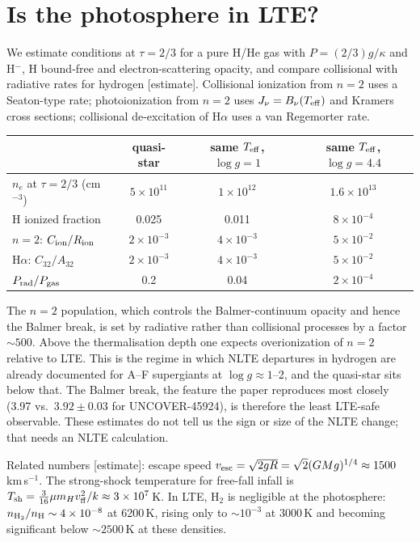 \documentclass[11pt]{article}
\newcommand{\status}[1]{\textsf{\small\textcolor{black!60}{[#1]}}}
\begin{document}
\section{Is the photosphere in LTE?}\label{sec:nlte}
We estimate conditions at $\tau=2/3$ for a pure H/He gas with $P=(2/3)g/\kappa$ and H$^-$, H bound-free
and electron-scattering opacity, and compare collisional with radiative rates for hydrogen
\status{estimate}. Collisional ionization from $n=2$ uses a Seaton-type rate; photoionization from $n=2$ uses
$J_\nu=B_\nu(T_{\rm eff})$ and Kramers cross sections; collisional de-excitation of H$\alpha$ uses a van
Regemorter rate.
\begin{center}
\begin{tabular}{lccc}
\toprule
 & quasi-star & same $T_{\rm eff}$, $\log g=1$ & same $T_{\rm eff}$, $\log g=4.4$ \\
\midrule
$n_e$ at $\tau=2/3$ (cm$^{-3}$) & $5\times10^{11}$ & $1\times10^{12}$ & $1.6\times10^{13}$ \\
H ionized fraction & 0.025 & 0.011 & $8\times10^{-4}$\\
$n=2$: $C_{\rm ion}/R_{\rm ion}$ & $2\times10^{-3}$ & $4\times10^{-3}$ & $5\times10^{-2}$\\
H$\alpha$: $C_{32}/A_{32}$ & $2\times10^{-3}$ & $4\times10^{-3}$ & $5\times10^{-2}$\\
$P_{\rm rad}/P_{\rm gas}$ & 0.2 & 0.04 & $2\times10^{-4}$\\
\bottomrule
\end{tabular}
\end{center}
The $n=2$ population, which controls the Balmer-continuum opacity and hence the Balmer break, is set by
radiative rather than collisional processes by a factor $\sim500$. Above the thermalisation depth one
expects overionization of $n=2$ relative to LTE. This is the regime in which NLTE departures in hydrogen are
already documented for A--F supergiants at $\log g\approx1$--2, and the quasi-star sits below that. The
Balmer break, the feature the paper reproduces most closely (3.97 vs.\ $3.92\pm0.03$ for UNCOVER-45924), is
therefore the least LTE-safe observable. These estimates do not tell us the sign or size of the NLTE
change; that needs an NLTE calculation.

Related numbers \status{estimate}: escape speed $v_{\rm esc}=\sqrt{2gR}=\sqrt2(GMg)^{1/4}\approx1500$\,km\,s$^{-1}$.
The strong-shock temperature for free-fall infall is $T_{\rm sh}=\tfrac{3}{16}\mu m_Hv_{\rm ff}^2/k\approx3\times10^7$\,K.
In LTE, H$_2$ is negligible at the photosphere: $n_{\rm H_2}/n_{\rm H}\sim4\times10^{-8}$ at 6200\,K, rising only to
$\sim10^{-3}$ at 3000\,K and becoming significant below $\sim2500$\,K at these densities.
\end{document}
